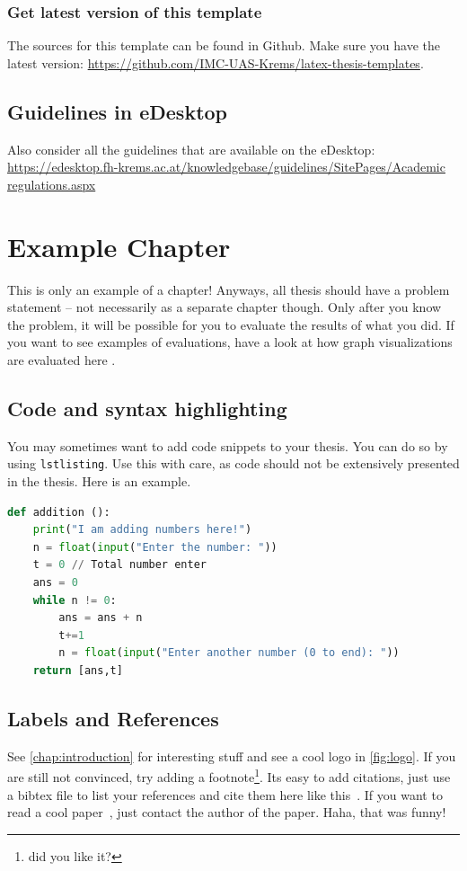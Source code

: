 \documentclass{imc-rai}
\begin{document}
\subsection{Get latest version of this template}
The sources for this template can be found in Github. Make sure you have the latest version: \url{https://github.com/IMC-UAS-Krems/latex-thesis-templates}. 

\section{Guidelines in eDesktop}
Also consider all the guidelines that are available on the eDesktop: \url{https://edesktop.fh-krems.ac.at/knowledgebase/guidelines/SitePages/Academic regulations.aspx} 


\chapter{Example Chapter}
This is only an example of a chapter! Anyways, all thesis should have a problem statement -- not necessarily as a separate chapter though. Only after you know the problem, it will be possible for you to evaluate the results of what you did. If you want to see examples of evaluations, have a look at how graph visualizations are evaluated here \cite{DBLP:journals/access/BurchHWPWH21}. 

\section{Code and syntax highlighting}

You may sometimes want to add code snippets to your thesis. You can do so by using \texttt{lstlisting}. Use this with care, as code should not be extensively presented in the thesis. Here is an example. 

\begin{lstlisting}[language=Python]
def addition ():
    print("I am adding numbers here!")
    n = float(input("Enter the number: "))
    t = 0 // Total number enter
    ans = 0
    while n != 0:
        ans = ans + n
        t+=1
        n = float(input("Enter another number (0 to end): "))
    return [ans,t]
\end{lstlisting}

\section{Labels and References}
See \autoref{chap:introduction} for interesting stuff and see a cool logo in \autoref{fig:logo}. If you are still not convinced, try adding a footnote\footnote{did you like it?}. Its easy to add citations, just use a bibtex file to list your references and cite them here like this~\cite{988366}. If you want to read a cool paper~\cite{DBLP:conf/euromicro/DhunganaHW20}, just contact the author of the paper. Haha, that was funny! 
\end{document}
